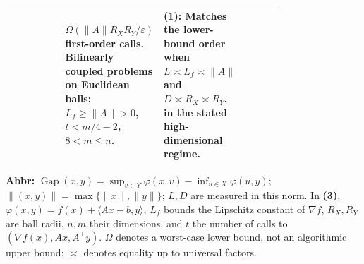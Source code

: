 \begin{table}[tp]
\begin{threeparttable}
\begin{tabularx}{\linewidth}{@{}>{\raggedright\arraybackslash}p{0.20\linewidth}>{\raggedright\arraybackslash}p{0.32\linewidth}>{\raggedright\arraybackslash}p{0.25\linewidth}>{\raggedright\arraybackslash}X@{}}
& $\Omega(\|A\|R_XR_Y/\varepsilon)$ first-order calls. Bilinearly coupled problems on Euclidean balls; $L_f\ge\|A\|>0$, $t<m/4-2$, $8<m\le n$.
& \textbf{(1)}: Matches the lower-bound order when $L\asymp L_f\asymp\|A\|$ and $D\asymp R_X\asymp R_Y$, in the stated high-dimensional regime.
& \\
\bottomrule
\end{tabularx}
\begin{tablenotes}[flushleft]\footnotesize
\item[] \textbf{Abbr:} $\operatorname{Gap}(x,y)=\sup_{v\in Y}\varphi(x,v)-\inf_{u\in X}\varphi(u,y)$; $\|(x,y)\|=\max\{\|x\|,\|y\|\}$; $L,D$ are measured in this norm. In \textbf{(3)}, $\varphi(x,y)=f(x)+\langle Ax-b,y\rangle$, $L_f$ bounds the Lipschitz constant of $\nabla f$, $R_X,R_Y$ are ball radii, $n,m$ their dimensions, and $t$ the number of calls to $(\nabla f(x),Ax,A^\top y)$. $\Omega$ denotes a worst-case lower bound, not an algorithmic upper bound; $\asymp$ denotes equality up to universal factors.
\end{tablenotes}
\end{threeparttable}
\end{table}
\clearpage
